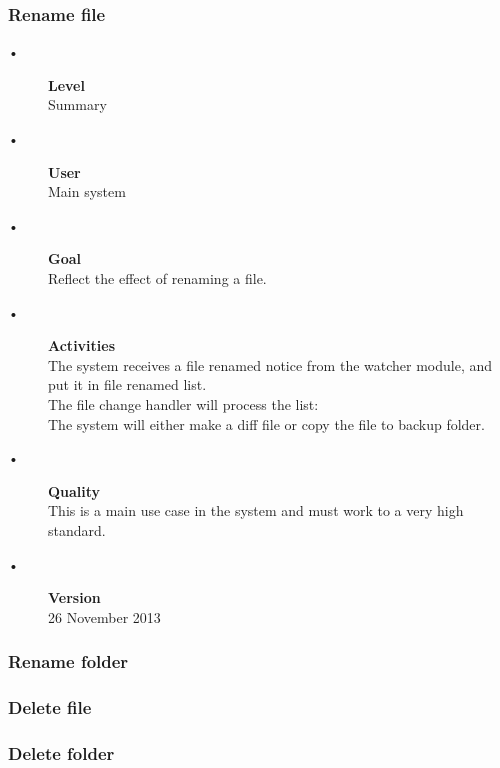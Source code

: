 \documentclass[12pt,a4paper]{article}
\begin{document}
\subsubsection{Rename file}
\begin{description}
	\item[•] \textbf{Level} \hfill \\
	Summary
	\item[•] \textbf{User} \hfill \\
	Main system
	\item[•] \textbf{Goal} \hfill \\
	Reflect the effect of renaming a file.
	\item[•] \textbf{Activities} \hfill \\
	The system receives a file renamed notice from the watcher module, and put it in file renamed list.\\
	The file change handler will process the list: \\
	The system will either make a diff file or copy the file to backup folder.
	\item[•] \textbf{Quality} \hfill \\
	This is a main use case in the system and must work to a very high standard.
	\item[•] \textbf{Version} \hfill \\
	26 November 2013	
\end{description}
\subsubsection{Rename folder}
\subsubsection{Delete file}
\subsubsection{Delete folder}
\end{document}
